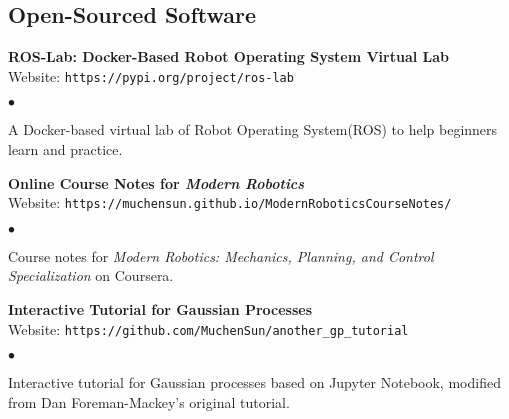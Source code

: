\documentclass[margin,line,pifont,palatino,courier]{res}
\newenvironment{list2}{
	\begin{list}{$\bullet$}{%
			\setlength{\itemsep}{0in}
			\setlength{\parsep}{0in} \setlength{\parskip}{0in}
			\setlength{\topsep}{0in} \setlength{\partopsep}{0in}
			\setlength{\leftmargin}{0.2in}}}{\end{list}}
\begin{document}
\begin{resume}
		\section{\sc Open-Sourced Software}
		
		
		{\bf ROS-Lab: Docker-Based Robot Operating System Virtual Lab} \\
		Website: \verb+https://pypi.org/project/ros-lab+ 
		\begin{list2}
			\item A Docker-based virtual lab of Robot Operating System(ROS) to help beginners learn and practice.
		\end{list2}
		
		{\bf Online Course Notes for \it Modern Robotics} \\
		Website: \verb+https://muchensun.github.io/ModernRoboticsCourseNotes/+ 
		\begin{list2}
			\item Course notes for {\it Modern Robotics: Mechanics, Planning, and Control Specialization} on Coursera.
		\end{list2}
		
		{\bf Interactive Tutorial for Gaussian Processes} \\
		Website: \verb+https://github.com/MuchenSun/another_gp_tutorial+ 
		\begin{list2}
			\item Interactive tutorial for Gaussian processes based on Jupyter Notebook, modified from Dan Foreman-Mackey's original tutorial.
		\end{list2}
			

\end{resume}
\end{document}
